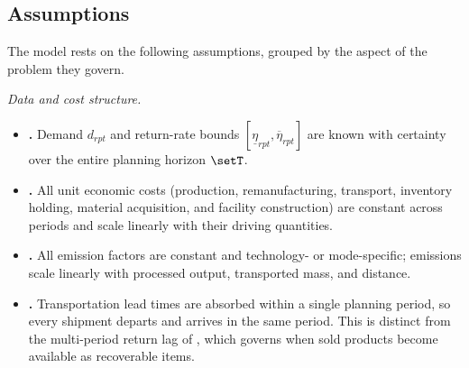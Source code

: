 
\subsection{Assumptions}
\label{sec:model:assumptions}

The model rests on the following assumptions, grouped by the aspect of
the problem they govern.

\medskip
\noindent\textit{Data and cost structure.}
\begin{itemize}[leftmargin=2.8em, label={}, itemsep=0.55em]
\item {}\label{as:det}%
  \textbf{\theassumption.}\enspace
  Demand $d_{rpt}$ and return-rate bounds
  $[\underline{\eta}_{rpt},\overline{\eta}_{rpt}]$ are known with
  certainty over the entire planning horizon $\setT$.
\item {}\label{as:lin}%
  \textbf{\theassumption.}\enspace
  All unit economic costs (production, remanufacturing, transport,
  inventory holding, material acquisition, and facility construction)
  are constant across periods and scale linearly with their driving
  quantities.
\item {}\label{as:emis}%
  \textbf{\theassumption.}\enspace
  All emission factors are constant and technology- or mode-specific;
  emissions scale linearly with processed output, transported mass,
  and distance.
\item {}\label{as:lead}%
  \textbf{\theassumption.}\enspace
  Transportation lead times are absorbed within a single planning
  period, so every shipment departs and arrives in the same period.
  This is distinct from the multi-period return lag of
  , which governs when sold products become available
  as recoverable items.
\end{itemize}

